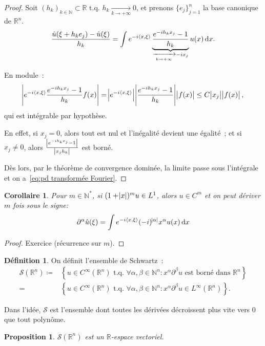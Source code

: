 \documentclass{report}
\newcommand{\R}{{\mathbb R}}
\newcommand{\N}{{\mathbb N}}
\newcommand{\scpr}[2]{\left\langle#1, #2\right\rangle}
\newcommand{\tq}{\text{ t.q. }}
\newcommand{\pinfty}{{+\infty}}
\newtheorem{prp}[thm]{Proposition}
\newtheorem{cor}[thm]{Corollaire}
\theoremstyle{definition}
\newtheorem{déf}[thm]{Définition}
\theoremstyle{remark}
\begin{document}
\begin{proof} Soit $(h_k)_{k \in \N} \subset \R \tq h_k \xrightarrow[k \to \pinfty]{} 0$, et prenons $\{e_j\}_{j=1}^n$ la base canonique de $\R^n$.
\[\frac {\hat u(\xi + h_ke_j) - \hat u(\xi)}{h_k} = \int e^{-i\scpr x\xi}\underbrace {\frac {e^{-ih_kx_j}-1}{h_k}}_{\xrightarrow[k \to \pinfty]{} -ix_j}u(x)\dif x.\]

En module~:
\[\abs {e^{-i\scpr x\xi}\frac {e^{-ih_kx_j}-1}{h_k}f(x)} = \abs {e^{-i\scpr x\xi}}\abs {\frac {e^{-ih_kx_j}-1}{h_k}}\abs {f(x)} \leq C\abs {x_j}\abs {f(x)},\]
qui est intégrable par hypothèse.

En effet, si $x_j = 0$, alors tout est nul et l'inégalité devient une égalité~; et si $x_j \neq 0$, alors $\frac {\abs {e^{-ih_kx_j}-1}}{\abs {x_jh_k}}$ est borné.

Dès lors, par le théorème de convergence dominée, la limite passe sous l'intégrale et on a~\eqref{eq:pd transformée Fourier}.
\end{proof}

\begin{cor} Pour $m \in \N^*$, si $(1+\abs x)^mu \in L^1$, alors $u \in C^m$ et on peut dériver $m$ fois sous le signe:
\[\partial^\alpha\hat u(\xi) = \int e^{-i\scpr x\xi}(-i)^{\abs \alpha}x^\alpha u(x)\dif x\]
\end{cor}

\begin{proof} Exercice (récurrence sur $m$).
\end{proof}

\begin{déf} On définit l'ensemble de Schwartz~:
\begin{equation}\begin{aligned}
	\mathcal S(\R^n) \coloneqq &\left\{u \in C^\infty(\R^n) \tq \forall \alpha, \beta \in \N^n : x^\alpha\partial^\beta u \text{ est borné dans } \R^n\right\} \\
		= &\left\{u \in C^\infty(\R^n) \tq \forall \alpha, \beta \in \N^n : x^\alpha\partial^\beta u \in L^\infty(\R^n)\right\}.
\end{aligned}\end{equation}
\end{déf}

Dans l'idée, $\mathcal S$ est l'ensemble dont toutes les dérivées décroissent plus vite vers 0 que tout polynôme.

\begin{prp} $\mathcal S(\R^n)$ est un $\R$-espace vectoriel.
\end{prp}
\end{document}
